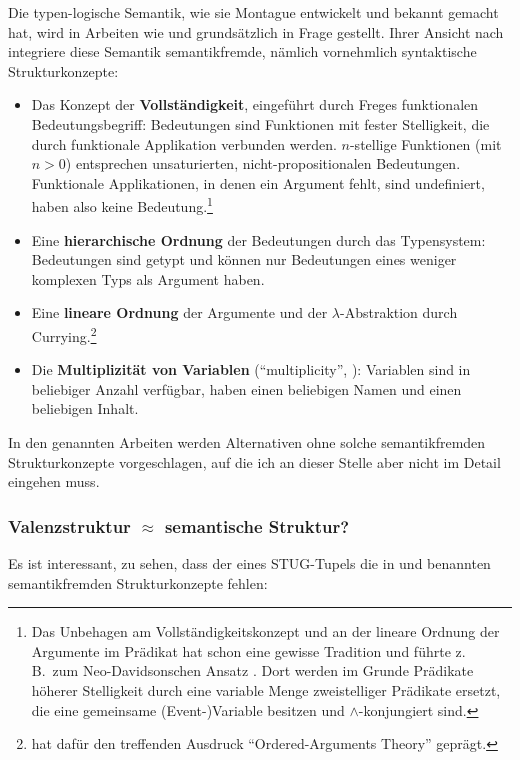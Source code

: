 {Die typen-logische Semantik, wie sie Montague entwickelt und bekannt gemacht hat, wird in Arbeiten wie \cite{Kracht:07,Kracht:11} und \cite{Erdelyi-Szabo:etal:08} grundsätzlich in Frage gestellt. Ihrer Ansicht nach integriere diese Semantik semantikfremde, nämlich vornehmlich syntaktische Strukturkonzepte:

\begin{itemize}
  \item Das Konzept der {\bf Vollständigkeit}, eingeführt durch Freges funktionalen Bedeutungsbegriff: Bedeutungen sind Funktionen mit fester Stelligkeit, die durch funktionale Applikation verbunden werden. $n$-stellige Funktionen (mit $n > 0$) entsprechen unsaturierten, nicht-propositionalen Bedeutungen. Funktionale Applikationen, in denen ein Argument fehlt, sind undefiniert, haben also keine Bedeutung.\footnote{Das Unbehagen am Vollständigkeitskonzept und an der lineare Ordnung der Argumente im Prädikat hat schon eine gewisse Tradition und führte z.\,B.\ zum Neo-Davidsonschen Ansatz \citep{Parsons:90,Parsons:95}. Dort werden im Grunde Prädikate höherer Stelligkeit durch eine variable Menge zweistelliger Prädikate ersetzt, die eine gemeinsame (Event-)Variable besitzen und $\wedge$-konjungiert sind.}
  \item Eine {\bf hierarchische Ordnung} der Bedeutungen durch das Typensystem: Bedeutungen sind getypt und können nur Bedeutungen eines weniger komplexen Typs als Argument haben.  
  \item Eine {\bf lineare Ordnung} der Argumente und der $\lambda$-Abstraktion durch Currying.\footnote{\cite{Dowty:89} hat dafür den treffenden Ausdruck "`Ordered-Arguments Theory"' geprägt.}
  \item Die {\bf Multiplizität von Variablen} ("`multiplicity"', \citealt{Kracht:07,Kracht:11}): Variablen sind in beliebiger Anzahl verfügbar, haben einen beliebigen Namen und einen beliebigen Inhalt.
\end{itemize}
In den genannten Arbeiten werden Alternativen ohne solche semantikfremden Strukturkonzepte vorgeschlagen, auf die ich an dieser Stelle aber nicht im Detail eingehen muss. 

\subsubsection*{Valenzstruktur $\approx$ semantische Struktur?} 

Es ist interessant, zu sehen, dass der  eines STUG-Tupels die in \cite{Kracht:07,Kracht:11} und \cite{Erdelyi-Szabo:etal:08} benannten semantikfremden Strukturkonzepte fehlen: 

}
